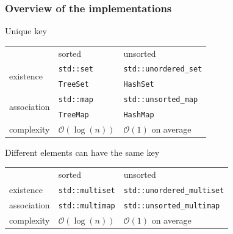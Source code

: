 \documentclass[10pt,svgnames,usenames,table]{beamer} %
\newcommand{\bigoh}{\mathcal{O}}
\begin{document}
\begin{frame}
  \frametitle{Overview of the implementations}
  \begin{block}{Unique key}
    \begin{center}
      \begin{tabular}{lll}
        & sorted & unsorted\\
        \multirow{2}{*}{existence} & \lstinline|std::set| & \lstinline|std::unordered_set|\\
                  & \lstinline|TreeSet|  & \lstinline|HashSet|\\
        \multirow{2}{*}{association} & \lstinline|std::map| & \lstinline|std::unsorted_map|\\
                    & \lstinline|TreeMap|  & \lstinline|HashMap|\\
        complexity & $\bigoh(\log(n))$ & $\bigoh(1)$ on average
      \end{tabular}
    \end{center}
  \end{block}
  \begin{block}{Different elements can have the same key}
    \begin{center}
      \begin{tabular}{lll}
        & sorted & unsorted\\
        existence & \lstinline|std::multiset| & \lstinline|std::unordered_multiset|\\
        association & \lstinline|std::multimap| & \lstinline|std::unsorted_multimap|\\
        complexity & $\bigoh(\log(n))$ & $\bigoh(1)$ on average
      \end{tabular}
    \end{center}
  \end{block}
\end{frame}
\end{document}
